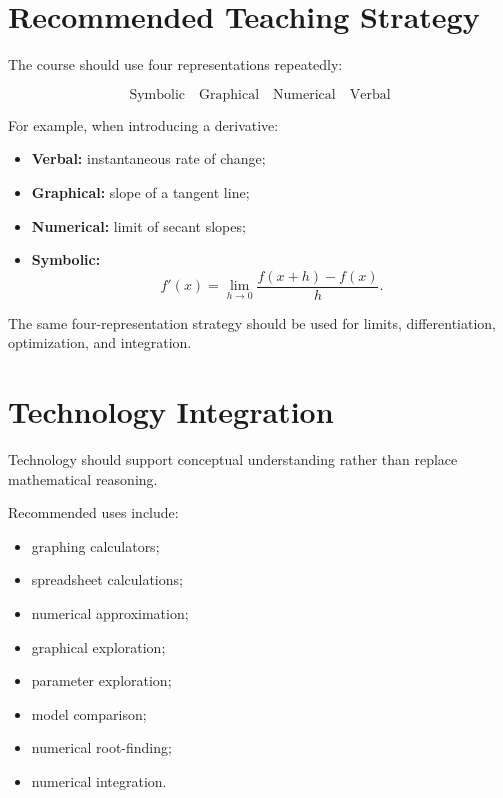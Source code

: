 \documentclass[11pt]{article}
\begin{document}
\section{Recommended Teaching Strategy}

The course should use four representations repeatedly:

\[
\boxed{
\text{Symbolic}
\quad
\text{Graphical}
\quad
\text{Numerical}
\quad
\text{Verbal}
}
\]

For example, when introducing a derivative:

\begin{itemize}
    \item \textbf{Verbal:} instantaneous rate of change;
    \item \textbf{Graphical:} slope of a tangent line;
    \item \textbf{Numerical:} limit of secant slopes;
    \item \textbf{Symbolic:}
          \[
          f'(x)=\lim_{h\to0}
          \frac{f(x+h)-f(x)}{h}.
          \]
\end{itemize}

The same four-representation strategy should be used for limits,
differentiation, optimization, and integration.

\section{Technology Integration}

Technology should support conceptual understanding rather than replace
mathematical reasoning.

Recommended uses include:

\begin{itemize}
    \item graphing calculators;
    \item spreadsheet calculations;
    \item numerical approximation;
    \item graphical exploration;
    \item parameter exploration;
    \item model comparison;
    \item numerical root-finding;
    \item numerical integration.
\end{itemize}
\end{document}
